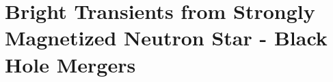\chapter[Bright Transients from Black Hole - Neutron Star Mergers]{Bright Transients from Strongly Magnetized Neutron Star - Black Hole Mergers }
\label{ch:NSBH_Fireball}













